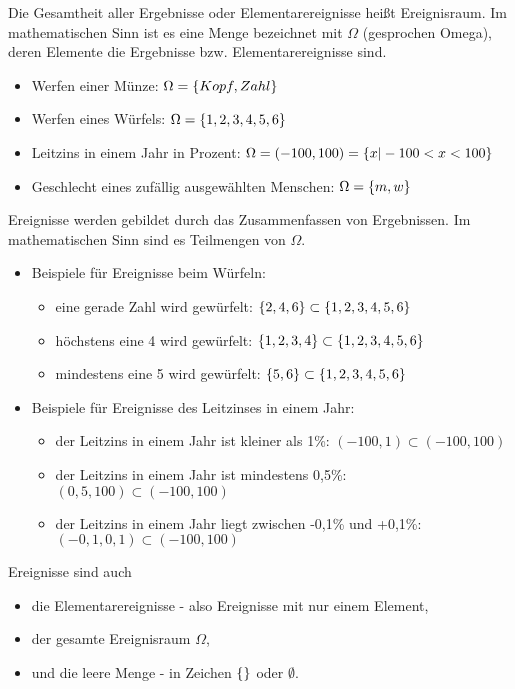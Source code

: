 Die Gesamtheit aller Ergebnisse oder Elementarereignisse heißt Ereignisraum. Im mathematischen Sinn ist es eine Menge bezeichnet mit $\Omega$ (gesprochen Omega), deren Elemente die Ergebnisse bzw. Elementarereignisse sind.

\begin{itemize}
		\item Werfen einer Münze: $\Omega = \gkl{Kopf, Zahl}$
		\item Werfen eines Würfels: $\Omega = \gkl{1,2,3,4,5,6}$
		\item  Leitzins in einem Jahr in Prozent:  $\Omega =(-100,100)=\gkl{x| -100 <  x < 100}$
		\item Geschlecht eines zufällig ausgewählten Menschen: $\Omega = \gkl{m, w}$
\end{itemize}

Ereignisse werden gebildet durch das Zusammenfassen von Ergebnissen. Im mathematischen Sinn sind es Teilmengen von $\Omega$. 

\begin{itemize}
		\item Beispiele für Ereignisse beim Würfeln:
			\begin{itemize} 
				\item eine gerade Zahl wird gewürfelt: $\gkl{2,4,6}\subset \gkl{1,2,3,4,5,6}$
				\item höchstens eine 4 wird gewürfelt: $\gkl{1,2,3,4}\subset \gkl{1,2,3,4,5,6}$
				\item mindestens eine 5 wird gewürfelt: $\gkl{5,6}\subset \gkl{1,2,3,4,5,6}$
			\end{itemize}
		\item Beispiele für Ereignisse des Leitzinses in einem Jahr:
			\begin{itemize} 
				\item der Leitzins in einem Jahr ist kleiner als 1\%:  $(-100, 1) \subset (-100, 100)$
				\item der Leitzins in einem Jahr ist mindestens 0,5\%:  $(0,5, 100)  \subset (-100, 100)$
				\item der Leitzins in einem Jahr liegt zwischen -0,1\% und +0,1\%: $(-0,1, 0,1)  \subset (-100, 100)$
			\end{itemize}
\end{itemize}

Ereignisse sind auch 
\begin{itemize}
	\item die Elementarereignisse - also Ereignisse mit nur einem Element,
	\item der gesamte Ereignisraum $\Omega$,
	\item und die leere Menge - in Zeichen $\gkl{}$ oder $\emptyset$.
\end{itemize}

